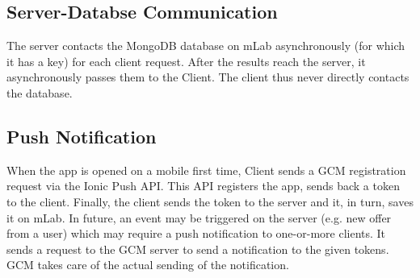 \subsection{Server-Databse Communication}

The server contacts the MongoDB database on mLab asynchronously (for which it has a key) for each client request. After the results reach the server, it asynchronously passes them to the Client. The client thus never directly contacts the database.

\subsection{Push Notification}

When the app is opened on a mobile first time, Client sends a GCM registration request via the Ionic Push API. This API registers the app, sends back a token to the client. Finally, the client sends the token to the server and it, in turn, saves it on mLab. In future, an event may be triggered on the server (e.g. new offer from a user) which may require a push notification to one-or-more clients. It sends a request to the GCM server to send a notification to the given tokens. GCM takes care of the actual sending of the notification.
